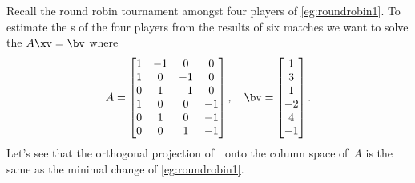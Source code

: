 \begin{example} \label{eg:roundrobin2}
Recall the round robin tournament amongst four players of \autoref{eg:roundrobin1}.
To estimate the s of the four players from the results of six matches we want to solve the 
 \(A\xv=\bv\) where
\begin{equation*}
A=\begin{bmatrix}    1 & -1 & 0 & 0
\\ 1 & 0 & -1 & 0
\\ 0 & 1 & -1 & 0
\\ 1 & 0 & 0 & -1
\\ 0 & 1 & 0 & -1
\\ 0 & 0 & 1 & -1
 \end{bmatrix},\quad
 \bv=\begin{bmatrix} 1\\ 3\\ 1\\ -2\\ 4\\ -1 \end{bmatrix}.
\end{equation*}
Let's see that the orthogonal projection of~\bv\ onto the column space of~\(A\) is the same as the minimal change of \autoref{eg:roundrobin1}.


\end{example}
